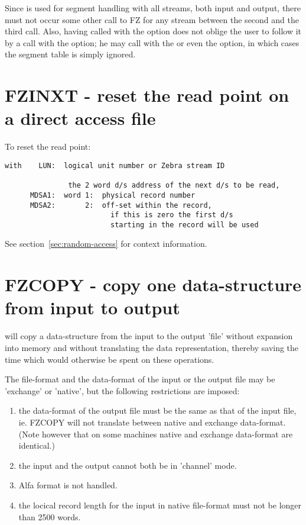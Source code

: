 Since  is used for segment handling with all streams,
both input and output, there must not occur some other call
to FZ for any stream between the second and the third call.
Also, having called with the  option does not oblige the user
to follow it by a call with the  option;
he may call with the  or even the  option,
in which cases the segment table is simply ignored.

\section{FZINXT - reset the read point on a direct access file}

To reset the read point:

\begin{verbatim}
with    LUN:  logical unit number or Zebra stream ID

               the 2 word d/s address of the next d/s to be read,
      MDSA1:  word 1:  physical record number
      MDSA2:       2:  off-set within the record,
                         if this is zero the first d/s
                         starting in the record will be used
\end{verbatim}
See section~\ref{sec:random-access} for context information.

\section{FZCOPY - copy one data-structure from input to output}

 will copy a data-structure from the input to the output 'file'
without expansion into memory and without translating the data
representation, thereby saving the time which would otherwise
be spent on these operations.

The file-format and the data-format of the input or the output file
may be 'exchange' or 'native', but the following restrictions are
imposed:
\begin{enumerate}
   \item the data-format of the output file must be the same as that
      of the input file, ie. FZCOPY will not translate between
      native and exchange data-format. (Note however that on some
      machines native and exchange data-format are identical.)
   \item the input and the output cannot both be in 'channel' mode.
   \item Alfa format is not handled.
   \item the locical record length for the input in native file-format
      must not be longer than 2500 words.
\end{enumerate}

